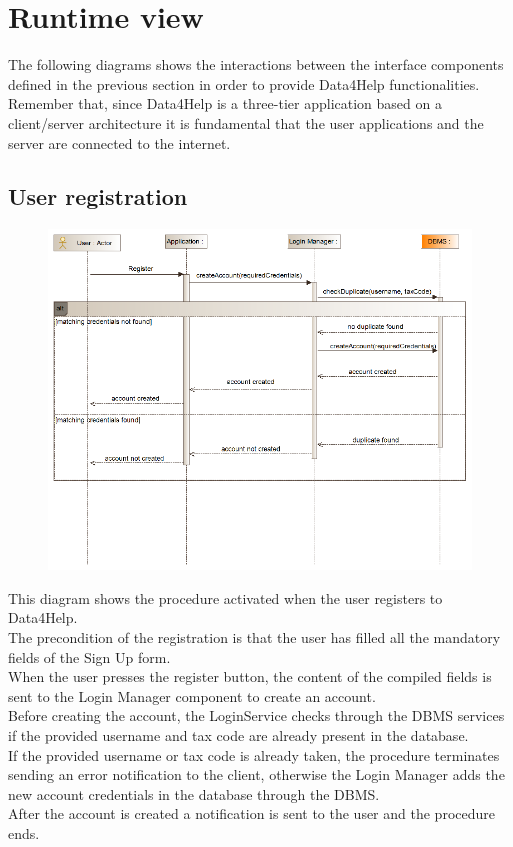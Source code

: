 \section{Runtime view}
The following diagrams shows the interactions between the interface components defined in the previous section in  order to provide Data4Help functionalities. Remember that, since Data4Help is a three-tier application based on a client/server architecture it is fundamental that the user applications and the server are connected to the internet.
\subsection{User registration}
\begin{figure}[H]
\centering
\includegraphics[width=\linewidth]{resources/uml/sequence/Registration.png}
\end{figure}
This diagram shows the procedure activated when the user registers to Data4Help.\\
The precondition of the registration is that the user has filled all the mandatory fields of the Sign Up form.\\
When the user presses the register button, the content of the compiled fields is sent to the Login Manager component to create an account.\\
Before creating the account, the LoginService checks through the DBMS services if the provided username and tax code are already present in the database.\\
If the provided username or tax code is already taken, the procedure terminates sending an error notification to the client, otherwise the Login Manager adds the new account credentials in the database through the DBMS.\\
After the account is created a notification is sent to the user and the procedure ends.


